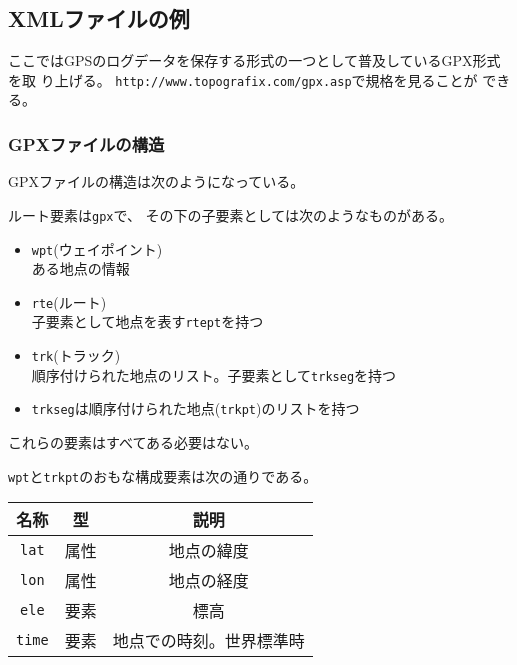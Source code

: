 \subsection{XMLファイルの例}
ここではGPSのログデータを保存する形式の一つとして普及しているGPX形式を取
り上げる。 \texttt{http://www.topografix.com/gpx.asp}で規格を見ることが
できる。
\subsubsection{GPXファイルの構造}
GPXファイルの構造は次のようになっている。

 ルート要素は\texttt{gpx}で、
 その下の子要素としては次のようなものがある。
\begin{itemize}
 \item \texttt{wpt}(ウェイポイント)\\
			 ある地点の情報
 \item \texttt{rte}(ルート)\\
			 子要素として地点を表す\texttt{rtept}を持つ
 \item \texttt{trk}(トラック)\\
			 順序付けられた地点のリスト。子要素として\texttt{trkseg}を持つ
 \item \texttt{trkseg}は順序付けられた地点(\texttt{trkpt})のリストを持つ
\end{itemize}
 これらの要素はすべてある必要はない。

 \texttt{wpt}と\texttt{trkpt}のおもな構成要素は次の通りである。
\begin{center}
	 \begin{tabular}{|c|c|c|}\hline
		名称&型&\multicolumn{1}{c|}{説明}\\\hline
		\texttt{lat}&属性 & 地点の緯度\\ \hline
		\texttt{lon}&属性 & 地点の経度\\ \hline
		\texttt{ele}&要素 &標高 \\ \hline
		\texttt{time}&要素 &地点での時刻。世界標準時 \\ \hline
 \end{tabular}
\end{center}
